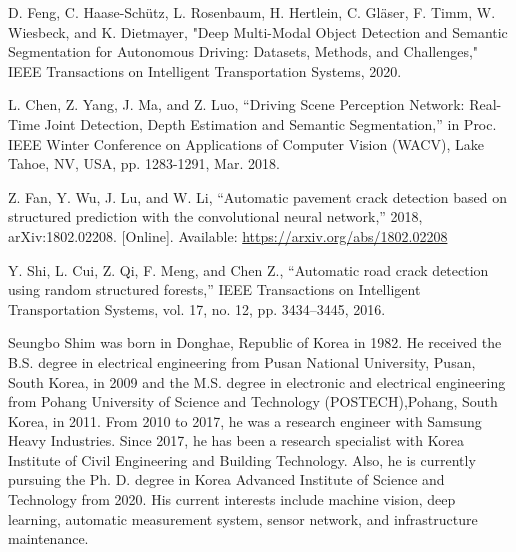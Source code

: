 \documentclass{ieeeaccess}
\begin{document}
\begin{thebibliography}{00}
 D. Feng, C. Haase-Schütz, L. Rosenbaum, H. Hertlein, C. Gläser, F. Timm, W. Wiesbeck, and K. Dietmayer, "Deep Multi-Modal Object Detection and Semantic Segmentation for Autonomous Driving: Datasets, Methods, and Challenges," IEEE Transactions on Intelligent Transportation Systems, 2020.

 L. Chen, Z. Yang, J. Ma, and Z. Luo, ``Driving Scene Perception Network: Real-Time Joint Detection, Depth Estimation and Semantic Segmentation,'' in Proc. IEEE Winter Conference on Applications of Computer Vision (WACV), Lake Tahoe, NV, USA, pp. 1283-1291, Mar. 2018.

 Z. Fan, Y. Wu, J. Lu, and W. Li, ``Automatic pavement crack detection based on structured prediction with the convolutional neural network,'' 2018, arXiv:1802.02208. [Online]. Available: \underline{https://arxiv.org/abs/1802.02208}

 Y. Shi, L. Cui, Z. Qi, F. Meng, and Chen Z., ``Automatic road crack detection using random structured forests,'' IEEE Transactions on Intelligent Transportation Systems, vol. 17, no. 12, pp. 3434–3445, 2016.


\end{thebibliography}

\begin{IEEEbiography}{Seungbo Shim} was born in Donghae, Republic of Korea in 1982. He received the B.S. degree in electrical engineering from Pusan National University, Pusan, South Korea, in 2009 and the M.S. degree in electronic and electrical engineering from Pohang University of Science and Technology (POSTECH),Pohang, South Korea, in 2011.
From 2010 to 2017, he was a research engineer with Samsung Heavy Industries. Since 2017, he has been a research specialist with Korea Institute of Civil Engineering and Building Technology. Also, he is currently pursuing the Ph. D. degree in Korea Advanced Institute of Science and Technology from 2020. His current interests include machine vision, deep learning, automatic measurement system, sensor network, and infrastructure maintenance.
\end{IEEEbiography}
\end{document}

